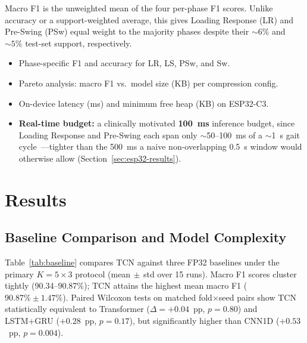 \documentclass[conference]{IEEEtran}
\begin{document}
Macro F1 is the unweighted mean of the four per-phase F1 scores. Unlike accuracy or a
support-weighted average, this gives Loading Response (LR) and Pre-Swing (PSw) equal weight to the
majority phases despite their $\sim\!6\%$ and $\sim\!5\%$ test-set support, respectively.

\begin{itemize}
  \item Phase-specific F1 and accuracy for LR, LS, PSw, and Sw.
  \item Pareto analysis: macro F1 vs.\ model size (KB) per compression config.
  \item On-device latency (ms) and minimum free heap (KB) on ESP32-C3.
  \item \textbf{Real-time budget:} a clinically motivated \textbf{100~ms} inference budget, since
        Loading Response and Pre-Swing each span only $\sim$50--100~ms of a $\sim$1~s gait
        cycle~\cite{ref8}---tighter than the 500~ms a naive non-overlapping 0.5~s window would
        otherwise allow (Section~\ref{sec:esp32-results}).
\end{itemize}

\section{Results}
\label{sec:results}

\subsection{Baseline Comparison and Model Complexity}

Table~\ref{tab:baseline} compares TCN against three FP32 baselines under the primary
$K{=}5\times3$ protocol (mean$\,\pm$\,std over 15 runs). Macro F1 scores cluster tightly
(90.34--90.87\%); TCN attains the highest mean macro F1 ($90.87\%\pm1.47\%$). Paired Wilcoxon
tests on matched fold$\times$seed pairs show TCN statistically equivalent to Transformer
($\Delta{=}{+}0.04$~pp, $p{=}0.80$) and LSTM+GRU ($+0.28$~pp, $p{=}0.17$), but significantly
higher than CNN1D ($+0.53$~pp, $p{=}0.004$).
\end{document}
